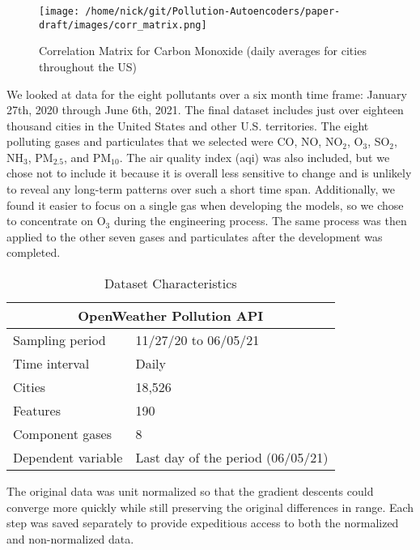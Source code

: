 \documentclass{article}
\begin{document}
\begin{figure}[h!]
\begin{center}
\texttt{[image: /home/nick/git/Pollution-Autoencoders/paper-draft/images/corr\_matrix.png]}
\end{center}
    \caption{Correlation Matrix for Carbon Monoxide (daily averages for cities throughout the US)}
\label{fig:matrix}
\end{figure}

\par We looked at data for the eight pollutants over a six month time frame: January 27th, 2020 through June 6th, 2021. The final dataset includes just over eighteen thousand cities in the United States and other U.S. territories. The eight polluting gases and particulates that we selected were CO, NO, NO$_2$, O$_3$, SO$_2$, NH$_3$, PM$_{2.5}$, and PM$_{10}$. The air quality index (aqi) was also included, but we chose not to include it because it is overall less sensitive to change and is unlikely to reveal any long-term patterns over such a short time span. Additionally, we found it easier to focus on a single gas when developing the models, so we chose to concentrate on O$_{3}$ during the engineering process. The same process was then applied to the other seven gases and particulates after the development was completed.

\begin{table}[h!]
\begin{center}
    \caption{Dataset Characteristics}
    \label{tab:table1}
    \vspace{0.1cm}
    \begin{tabular}{p{4cm}p{7cm}}
        \hline
        \multicolumn{2}{c}{OpenWeather Pollution API} \\
        \hline
        Sampling period  & 11/27/20 to 06/05/21\\
        Time interval & Daily  \\
        Cities & 18,526 \\
        Features & 190 \\
        Component gases & 8 \\
        Dependent variable & Last day of the period (06/05/21) \\
        \hline
    \end{tabular}
\end{center}
\end{table}

\par The original data was unit normalized so that the gradient descents could converge more quickly while still preserving the original differences in range. Each step was saved separately to provide expeditious access to both the normalized and non-normalized data.
\end{document}
